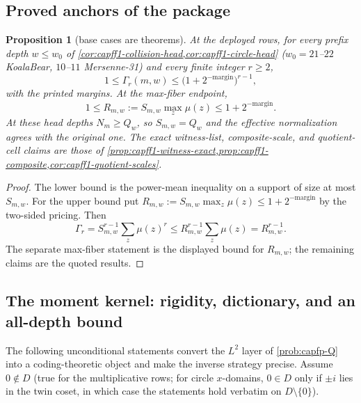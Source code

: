 \documentclass[11pt]{article}
\newtheorem{proposition}[proposition]{Proposition}
\theoremstyle{definition}
\theoremstyle{remark}
\begin{document}
\subsection{Proved anchors of the package}

\begin{proposition}[base cases are theorems]\label{prop:capfp-anchors}
At the deployed rows, for every prefix depth $w\le w_0$ of
\cref{cor:capff1-collision-head,cor:capff1-circle-head}
\textup($w_0=21$--$22$ KoalaBear, $10$--$11$ Mersenne-31\textup) and every finite integer $r\ge2$,
\[
        1\le\Gamma_r(m,w)\le
        \bigl(1+2^{-\mathrm{margin}}\bigr)^{r-1},
\]
with the printed margins.  At the max-fiber endpoint,
\[
        1\le R_{m,w}:=S_{m,w}\max_z\mu(z)
        \le1+2^{-\mathrm{margin}}.
\]
At these head depths $N_m\ge Q_w$, so $S_{m,w}=Q_w$ and the effective normalization agrees with the original one.  The exact witness-list, composite-scale, and quotient-cell claims are those of \cref{prop:capff1-witness-exact,prop:capff1-composite,cor:capff1-quotient-scales}.
\end{proposition}

\begin{proof}
The lower bound is the power-mean inequality on a support of size at most
$S_{m,w}$.  For the upper bound put
$R_{m,w}:=S_{m,w}\max_z\mu(z)\le1+2^{-\mathrm{margin}}$ by the two-sided
pricing.  Then
\[
\Gamma_r=S_{m,w}^{r-1}\sum_z\mu(z)^r
\le R_{m,w}^{r-1}\sum_z\mu(z)=R_{m,w}^{r-1}.
\]
The separate max-fiber statement is the displayed bound for $R_{m,w}$; the remaining claims are the quoted results.
\end{proof}

\subsection{The moment kernel: rigidity, dictionary, and an all-depth bound}

The following unconditional statements convert the $L^2$ layer of \cref{prob:capfp-Q} into a coding-theoretic object and make the inverse strategy precise.  Assume $0\notin D$ \textup(true for the multiplicative rows; for circle $x$-domains, $0\in D$ only if $\pm i$ lies in the twin coset, in which case the statements hold verbatim on $D\setminus\{0\}$\textup).
\end{document}
